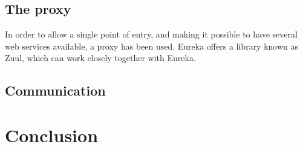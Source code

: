 \documentclass[a4paper,11pt,oneside]{book}
\renewcommand{\newpage}{}
\begin{document}
\section{The proxy}
In order to allow a single point of entry, and making it possible to have several web services available, a proxy has been used. Eureka offers a library known as Zuul, which can work closely together with Eureka. 

\section{Communication}

%
%
\chapter{Conclusion}


\end{document}
